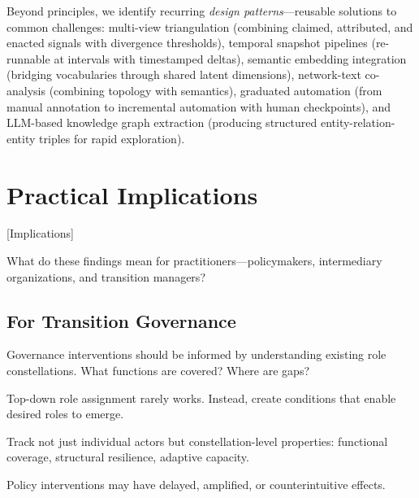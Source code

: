 \documentclass[../main.tex]{subfiles}
\begin{document}
Beyond principles, we identify recurring \textit{design patterns}---reusable solutions to common challenges: multi-view triangulation (combining claimed, attributed, and enacted signals with divergence thresholds), temporal snapshot pipelines (re-runnable at intervals with timestamped deltas), semantic embedding integration (bridging vocabularies through shared latent dimensions), network-text co-analysis (combining topology with semantics), graduated automation (from manual annotation to incremental automation with human checkpoints), and LLM-based knowledge graph extraction (producing structured entity-relation-entity triples for rapid exploration).


\section{Practical Implications}[Implications]

What do these findings mean for practitioners---policymakers, intermediary organizations, and transition managers?

\subsection{For Transition Governance}

\begin{description}[leftmargin=0.5cm, itemsep=0.3em]
\item[Map before intervening.] Governance interventions should be informed by understanding existing role constellations. What functions are covered? Where are gaps?
\item[Design for emergence.] Top-down role assignment rarely works. Instead, create conditions that enable desired roles to emerge.
\item[Monitor constellation health.] Track not just individual actors but constellation-level properties: functional coverage, structural resilience, adaptive capacity.
\item[Expect non-linearity.] Policy interventions may have delayed, amplified, or counterintuitive effects.
\end{description}
\end{document}
